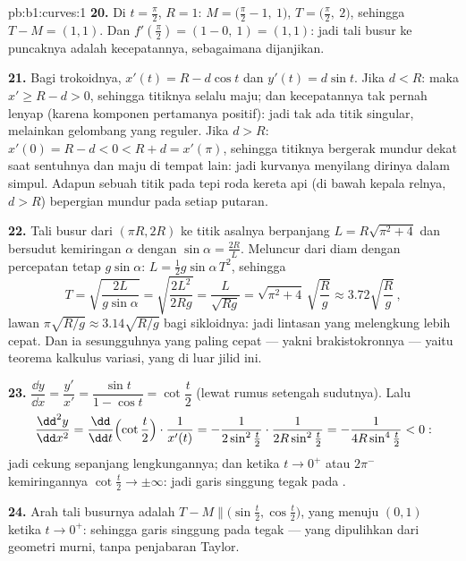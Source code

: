 \begin{solution}{pb:b1:curves:1}
\textbf{20.} Di $t = \frac\pi2$, $R = 1$: $M = \bigl(\frac\pi2 -
1,\ 1\bigr)$, $T = \bigl(\frac\pi2,\ 2\bigr)$, sehingga $T - M = (1,
1)$. Dan $f'(\frac\pi2) = (1 - 0,\ 1) = (1, 1)$: jadi tali busur ke
puncaknya adalah kecepatannya, sebagaimana dijanjikan.

\textbf{21.} Bagi trokoidnya, $x'(t) = R - d\cos t$ dan $y'(t)
= d\sin t$. Jika $d < R$: maka $x' \geq R - d > 0$, sehingga titiknya selalu
maju; dan kecepatannya tak pernah lenyap (karena komponen pertamanya
positif): jadi tak ada titik singular, melainkan gelombang yang reguler. Jika $d > R$: $x'(0)
= R - d < 0 < R + d = x'(\pi)$, sehingga titiknya bergerak mundur
dekat saat sentuhnya dan maju di tempat lain: jadi kurvanya
menyilang dirinya dalam simpul. Adapun sebuah titik pada tepi roda
kereta api (di bawah kepala relnya, $d > R$) bepergian mundur pada setiap
putaran.

\textbf{22.} Tali busur dari  $(\pi R, 2R)$ ke titik asalnya
berpanjang $L = R\sqrt{\pi^2 + 4}$ dan bersudut kemiringan $\alpha$ dengan
$\sin\alpha = \frac{2R}{L}$. Meluncur dari diam dengan percepatan
tetap $g\sin\alpha$: $L = \frac12 g\sin\alpha\,T^2$, sehingga
\[
T = \sqrt{\frac{2L}{g\sin\alpha}} = \sqrt{\frac{2L^2}{2Rg}}
= \frac{L}{\sqrt{Rg}} = \sqrt{\pi^2 + 4}\,\sqrt{\frac Rg}
\approx 3.72\sqrt{\frac Rg}\,,
\]
lawan $\pi\sqrt{R/g} \approx 3.14\sqrt{R/g}$ bagi sikloidnya:
jadi lintasan yang melengkung lebih cepat. Dan ia sesungguhnya yang paling cepat
--- yakni brakistokronnya --- yaitu teorema kalkulus
variasi, yang di luar jilid ini.

\textbf{23.} $\dfrac{\dd y}{\dd x} = \dfrac{y'}{x'} =
\dfrac{\sin t}{1 - \cos t} = \cot\dfrac t2$ (lewat rumus
setengah sudutnya). Lalu
\[
\frac{\dd^2y}{\dd x^2}
= \frac{\dd}{\dd t}\Bigl(\cot\frac t2\Bigr)\cdot\frac{1}{x'(t)}
= -\frac{1}{2\sin^2\frac t2}\cdot\frac{1}{2R\sin^2\frac t2}
= -\frac{1}{4R\sin^4\frac t2} < 0 :
\]
jadi cekung sepanjang lengkungannya; dan ketika $t \to 0^+$ atau $2\pi^-$
kemiringannya $\cot\frac t2 \to \pm\infty$: jadi garis singgung tegak pada
.

\textbf{24.} Arah tali busurnya adalah $T - M \parallel
\bigl(\sin\frac t2, \cos\frac t2\bigr)$, yang menuju $(0, 1)$
ketika $t \to 0^{+}$: sehingga garis singgung pada  tegak ---
yang dipulihkan dari geometri murni, tanpa penjabaran Taylor.


\end{solution}
